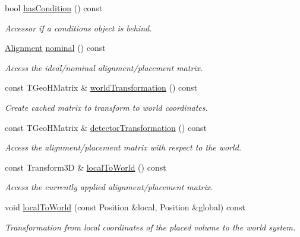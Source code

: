 \begin{DoxyCompactItemize}
bool \hyperlink{class_d_d4hep_1_1_alignments_1_1_alignment_data_a4ce9a61003981e6c9d39517eda97c5eb}{hasCondition} () const 
\begin{DoxyCompactList}\small\item\em Accessor if a conditions object is behind. \item\end{DoxyCompactList}\item 
\hyperlink{class_d_d4hep_1_1_alignments_1_1_alignment}{Alignment} \hyperlink{class_d_d4hep_1_1_alignments_1_1_alignment_data_a88f64b05b945fa57e6fc1ea030d4e2a1}{nominal} () const 
\begin{DoxyCompactList}\small\item\em Access the ideal/nominal alignment/placement matrix. \item\end{DoxyCompactList}\item 
const TGeoHMatrix \& \hyperlink{class_d_d4hep_1_1_alignments_1_1_alignment_data_ab650514d7615e907409fa397e43989f7}{worldTransformation} () const 
\begin{DoxyCompactList}\small\item\em Create cached matrix to transform to world coordinates. \item\end{DoxyCompactList}\item 
const TGeoHMatrix \& \hyperlink{class_d_d4hep_1_1_alignments_1_1_alignment_data_a7a47470d3b311ac1eab5acd888718dbf}{detectorTransformation} () const 
\begin{DoxyCompactList}\small\item\em Access the alignment/placement matrix with respect to the world. \item\end{DoxyCompactList}\item 
const Transform3D \& \hyperlink{class_d_d4hep_1_1_alignments_1_1_alignment_data_a080a3e23e54dfdef742d4849d9b41b5d}{localToWorld} () const 
\begin{DoxyCompactList}\small\item\em Access the currently applied alignment/placement matrix. \item\end{DoxyCompactList}\item 
void \hyperlink{class_d_d4hep_1_1_alignments_1_1_alignment_data_a84abb7a2397faef2d62cb1378f14e087}{localToWorld} (const Position \&local, Position \&global) const 
\begin{DoxyCompactList}\small\item\em Transformation from local coordinates of the placed volume to the world system. \item\end{DoxyCompactList}\item 

\end{DoxyCompactItemize}
